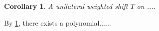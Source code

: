 \documentclass[12pt,a4paper]{article}
\newtheorem{corollary}{Corollary}[section]
\begin{document}
 \begin{corollary}\label{cor}
    A unilateral weighted shift $T$ on ....
 \end{corollary}

By \cref{cor}, there exists a polynomial......
\end{document}
